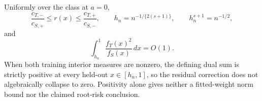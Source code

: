 Uniformly over the class at \(a=0\),
\[
\frac{c_{T,-}}{c_{S,+}}\le r(x)\le\frac{c_{T,+}}{c_{S,-}},
\qquad
h_n=n^{-1/\{2(s+1)\}},
\qquad
h_n^{s+1}=n^{-1/2},
\]
and
\[
\int_{h_n}^1\frac{f_T(x)^2}{f_S(x)}\,dx=O(1).
\]
When both training interior measures are nonzero, the defining dual sum is strictly positive at every held-out \(x\in[h_n,1]\), so the residual correction does not algebraically collapse to zero. Positivity alone gives neither a fitted-weight norm bound nor the claimed root-risk conclusion.